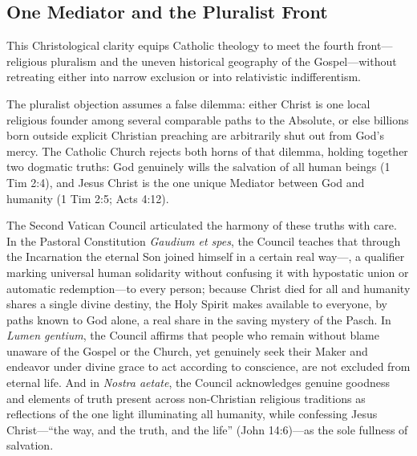 \subsection{One Mediator and the Pluralist Front}

This Christological clarity equips Catholic theology to meet the fourth front---religious pluralism and the uneven historical geography of the Gospel---without retreating either into narrow exclusion or into relativistic indifferentism.

The pluralist objection assumes a false dilemma: either Christ is one local religious founder among several comparable paths to the Absolute, or else billions born outside explicit Christian preaching are arbitrarily shut out from God's mercy. The Catholic Church rejects both horns of that dilemma, holding together two dogmatic truths: God genuinely wills the salvation of all human beings (1 Tim 2:4), and Jesus Christ is the one unique Mediator between God and humanity (1 Tim 2:5; Acts 4:12).

The Second Vatican Council articulated the harmony of these truths with care. In the Pastoral Constitution \textit{Gaudium et spes}, the Council teaches that through the Incarnation the eternal Son joined himself in a certain real way---, a qualifier marking universal human solidarity without confusing it with hypostatic union or automatic redemption---to every person; because Christ died for all and humanity shares a single divine destiny, the Holy Spirit makes available to everyone, by paths known to God alone, a real share in the saving mystery of the Pasch. In \textit{Lumen gentium}, the Council affirms that people who remain without blame unaware of the Gospel or the Church, yet genuinely seek their Maker and endeavor under divine grace to act according to conscience, are not excluded from eternal life. And in \textit{Nostra aetate}, the Council acknowledges genuine goodness and elements of truth present across non-Christian religious traditions as reflections of the one light illuminating all humanity, while confessing Jesus Christ---``the way, and the truth, and the life'' (John 14:6)---as the sole fullness of salvation.

